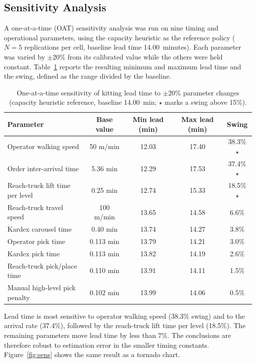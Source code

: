 \documentclass[conference]{IEEEtran}
\begin{document}
\subsection{Sensitivity Analysis}
\label{sec:res-sens}
A one-at-a-time (OAT) sensitivity analysis was run on nine timing and
operational parameters, using the capacity heuristic as the reference policy
($N=5$ replications per cell, baseline lead time 14.00~minutes). Each
parameter was varied by $\pm20\%$ from its calibrated value while the others
were held constant. Table~\ref{tab:sens} reports the resulting minimum and
maximum lead time and the swing, defined as the range divided by the baseline.

\begin{table}[htbp]
\centering
\caption{One-at-a-time sensitivity of kitting lead time to $\pm20\%$ parameter
changes (capacity heuristic reference, baseline 14.00~min; $\star$ marks a
swing above 15\%).}
\label{tab:sens}
\begin{tabular}{lcccc}
\toprule
Parameter & Base value & Min lead (min) & Max lead (min) & Swing \\
\midrule
Operator walking speed & 50 m/min & 12.03 & 17.40 & 38.3\% $\star$ \\
Order inter-arrival time & 5.36 min & 12.29 & 17.53 & 37.4\% $\star$ \\
Reach-truck lift time per level & 0.25 min & 12.74 & 15.33 & 18.5\% $\star$ \\
Reach-truck travel speed & 100 m/min & 13.65 & 14.58 & 6.6\% \\
Kardex carousel time & 0.40 min & 13.74 & 14.27 & 3.8\% \\
Operator pick time & 0.113 min & 13.79 & 14.21 & 3.0\% \\
Kardex pick time & 0.113 min & 13.82 & 14.19 & 2.6\% \\
Reach-truck pick/place time & 0.110 min & 13.91 & 14.11 & 1.5\% \\
Manual high-level pick penalty & 0.102 min & 13.99 & 14.06 & 0.5\% \\
\bottomrule
\end{tabular}
\end{table}

Lead time is most sensitive to operator walking speed (38.3\% swing) and to
the arrival rate (37.4\%), followed by the reach-truck lift time per level
(18.5\%). The remaining parameters move lead time by less than 7\%. The
conclusions are therefore robust to estimation error in the smaller timing
constants. Figure~\ref{fig:sens} shows the same result as a tornado chart.
\end{document}
